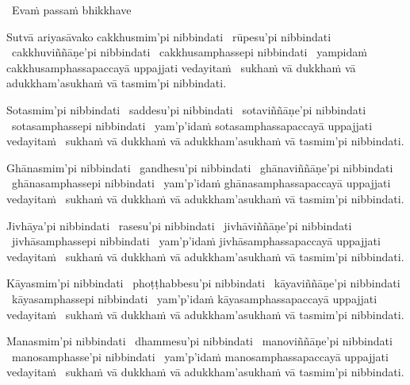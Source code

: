 \begin{pali-leader}
  \anglebracketleft\ \hspace{-0.5mm}Evaṁ passaṁ bhikkhave \hspace{-0.5mm}\anglebracketright\
\end{pali-leader}
\begin{pali-hangtogether}
  Sutvā ariyasāvako cakkhusmim'pi nibbindati \breathmark\ rūpesu'pi nibbindati \breathmark\ cakkhuviññāṇe'pi nibbindati \breathmark\ cakkhusamphassepi nibbindati \breathmark\ yampidaṁ cakkhusamphassapaccayā uppajjati vedayitaṁ \breathmark\ sukhaṁ vā dukkhaṁ vā adukkham'asukhaṁ vā tasmim'pi nibbindati.
\end{pali-hangtogether}

\begin{pali-hang}
  Sotasmim'pi nibbindati \breathmark\ saddesu'pi nibbindati \breathmark\ sotaviññāṇe'pi nibbindati \breathmark\ sotasamphassepi nibbindati \breathmark\ yam'p'idaṁ sotasamphassapaccayā uppajjati vedayitaṁ \breathmark\ sukhaṁ vā dukkhaṁ vā adukkham'asukhaṁ vā tasmim'pi nibbindati.
\end{pali-hang}

\begin{pali-hang}
  Ghānasmim'pi nibbindati \breathmark\ gandhesu'pi nibbindati \breathmark\ ghānaviññāṇe'pi nibbindati \breathmark\ ghānasamphassepi nibbindati \breathmark\ yam'p'idaṁ ghānasamphassapaccayā uppajjati vedayitaṁ \breathmark\ sukhaṁ vā dukkhaṁ vā adukkham'asukhaṁ vā tasmim'pi nibbindati.
\end{pali-hang}

\begin{pali-hang}
  Jivhāya'pi nibbindati \breathmark\ rasesu'pi nibbindati \breathmark\ jivhāviññāṇe'pi nibbindati \breathmark\ jivhāsamphassepi nibbindati \breathmark\ yam'p'idaṁ jivhāsamphassapaccayā uppajjati vedayitaṁ \breathmark\ sukhaṁ vā dukkhaṁ vā adukkham'asukhaṁ vā tasmim'pi nibbindati.
\end{pali-hang}

\begin{pali-hang}
  Kāyasmim'pi nibbindati \breathmark\ phoṭṭhabbesu'pi nibbindati \breathmark\ kāyaviññāṇe'pi nibbindati \breathmark\ kāyasamphassepi nibbindati \breathmark\ yam'p'idaṁ kāyasamphassapaccayā uppajjati vedayitaṁ \breathmark\ sukhaṁ vā dukkhaṁ vā adukkham'asukhaṁ vā tasmim'pi nibbindati.
\end{pali-hang}

\begin{pali-hang}
  Manasmim'pi nibbindati \breathmark\ dhammesu'pi nibbindati \breathmark\ manoviññāṇe'pi nibbindati \breathmark\ manosamphasse'pi nibbindati \breathmark\ yam'p'idaṁ manosamphassapaccayā uppajjati vedayitaṁ \breathmark\ sukhaṁ vā dukkhaṁ vā adukkham'asukhaṁ vā tasmim'pi nibbindati.
\end{pali-hang}

